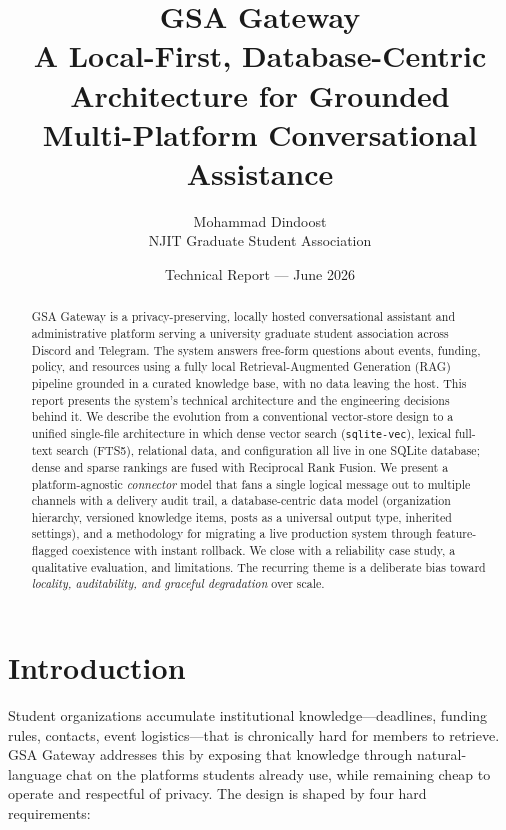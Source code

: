 \documentclass[11pt,letterpaper]{article}
\title{\vspace{-2em}\textbf{\color{njitred} GSA Gateway}\\[0.3em]
\large A Local-First, Database-Centric Architecture for Grounded\\
Multi-Platform Conversational Assistance}
\author{Mohammad Dindoost\\\small NJIT Graduate Student Association}
\date{\small Technical Report --- June 2026}
\newcommand{\code}[1]{\texttt{\small #1}}
\begin{document}
\maketitle

\begin{abstract}
\noindent
GSA Gateway is a privacy-preserving, locally hosted conversational assistant and
administrative platform serving a university graduate student association across
Discord and Telegram. The system answers free-form questions about events, funding,
policy, and resources using a fully local Retrieval-Augmented Generation (RAG)
pipeline grounded in a curated knowledge base, with no data leaving the host. This
report presents the system's technical architecture and the engineering decisions
behind it. We describe the evolution from a conventional vector-store design to a
unified single-file architecture in which dense vector search (\code{sqlite-vec}),
lexical full-text search (FTS5), relational data, and configuration all live in one
SQLite database; dense and sparse rankings are fused with Reciprocal Rank Fusion. We
present a platform-agnostic \emph{connector} model that fans a single logical message
out to multiple channels with a delivery audit trail, a database-centric data model
(organization hierarchy, versioned knowledge items, posts as a universal output type,
inherited settings), and a methodology for migrating a live production system through
feature-flagged coexistence with instant rollback. We close with a reliability case
study, a qualitative evaluation, and limitations. The recurring theme is a deliberate
bias toward \emph{locality, auditability, and graceful degradation} over scale.
\end{abstract}

\section{Introduction}

Student organizations accumulate institutional knowledge---deadlines, funding rules,
contacts, event logistics---that is chronically hard for members to retrieve. GSA
Gateway addresses this by exposing that knowledge through natural-language chat on the
platforms students already use, while remaining cheap to operate and respectful of
privacy. The design is shaped by four hard requirements:
\end{document}

